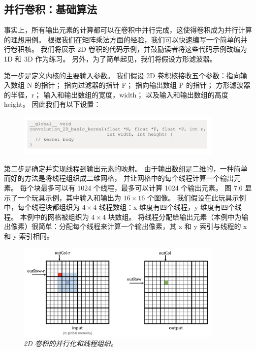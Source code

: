 \subsection{并行卷积：基础算法}
事实上，所有输出元素的计算都可以在卷积中并行完成，这使得卷积成为并行计算的理想用例。 
根据我们在矩阵乘法方面的经验，我们可以快速编写一个简单的并行卷积核。 
我们将展示 2D 卷积的代码示例，并鼓励读者将这些代码示例改编为 1D 和 3D 作为练习。 
另外，为了简单起见，我们将假设方形滤波器。

第一步是定义内核的主要输入参数。 我们假设 2D 卷积核接收五个参数：指向输入数组 N 的指针； 指向过滤器的指针 F； 
指向输出数组 P 的指针； 方形滤波器的半径，r； 输入和输出数组的宽度，width； 以及输入和输出数组的高度 height。 
因此我们有以下设置：

\begin{figure}[H]
	\centering
	\includegraphics[width=0.9\textwidth]{figs/F7-a2.png}
\end{figure}

第二步是确定并实现线程到输出元素的映射。 由于输出数组是二维的，一种简单而好的方法是将线程组织成二维网格，
并让网格中的每个线程计算一个输出元素。 每个块最多可以有 1024 个线程，最多可以计算 1024 个输出元素。 
图 7.6 显示了一个玩具示例，其中输入和输出为 $16 \times 16$ 个图像。 
我们假设在此玩具示例中，每个线程块都组织为 $4 \times 4$ 线程数组：x 维度有四个线程，y 维度有四个线程。 
本例中的网格被组织为 $4 \times 4$ 块数组。 
将线程分配给输出元素（本例中为输出像素）很简单：分配每个线程来计算一个输出像素，其 x 和 y 索引与线程的 x 和 y 索引相同。

\begin{figure}[H]
	\centering
	\includegraphics[width=0.9\textwidth]{figs/F7.6.png}
	\caption{\textit{2D 卷积的并行化和线程组织。}}
\end{figure}

